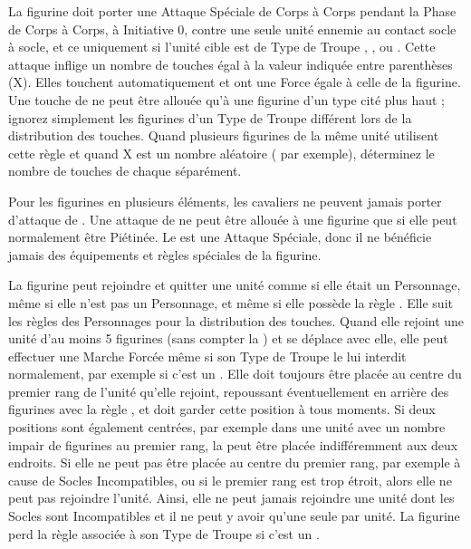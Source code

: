 
La figurine doit porter une Attaque Spéciale de Corps à Corps pendant la Phase de Corps à Corps, à Initiative 0, contre une seule unité ennemie au contact socle à socle, et ce uniquement si l'unité cible est de Type de Troupe \infantry{}, \warbeast{}, \swarm{} ou \warmachine{}. Cette attaque inflige un nombre de touches égal à la valeur indiquée entre parenthèses (X). Elles touchent automatiquement et ont une Force égale à celle de la figurine. Une touche de \stomp{} ne peut être allouée qu'à une figurine d'un type cité plus haut ; ignorez simplement les figurines d'un Type de Troupe différent lors de la distribution des touches. Quand plusieurs figurines de la même unité utilisent cette règle et quand X est un nombre aléatoire ( par exemple), déterminez le nombre de touches de chaque \stomp{} séparément.

Pour les figurines en plusieurs éléments, les cavaliers ne peuvent jamais porter d'attaque de \stomp{}. Une attaque de \stomp{} ne peut être allouée à une figurine que si elle peut normalement être Piétinée. Le \stomp{} est une Attaque Spéciale, donc il ne bénéficie jamais des équipements et règles spéciales de la figurine.

\label{warplatform}

La figurine peut rejoindre et quitter une unité comme si elle était un Personnage, même si elle n'est pas un Personnage, et même si elle possède la règle \toweringpresence{}. Elle suit les règles des Personnages pour la distribution des touches. Quand elle rejoint une unité d'au moins 5 figurines (sans compter la \warplatform{}) et se déplace avec elle, elle peut effectuer une Marche Forcée même si son Type de Troupe le lui interdit normalement, par exemple si c'est un \chariot{}. Elle doit toujours être placée au centre du premier rang de l'unité qu'elle rejoint, repoussant éventuellement en arrière des figurines avec la règle \frontrank{}, et doit garder cette position à tous moments. Si deux positions sont également centrées, par exemple dans une unité avec un nombre impair de figurines au premier rang, la \warplatform{} peut être placée indifféremment aux deux endroits. Si elle ne peut pas être placée au centre du premier rang, par exemple à cause de Socles Incompatibles, ou si le premier rang est trop étroit, alors elle ne peut pas rejoindre l'unité. Ainsi, elle ne peut jamais rejoindre une unité dont les Socles sont Incompatibles et il ne peut y avoir qu'une seule \warplatform{} par unité. La figurine perd la règle \swiftstride{} associée à son Type de Troupe si c'est un \chariot{}.

